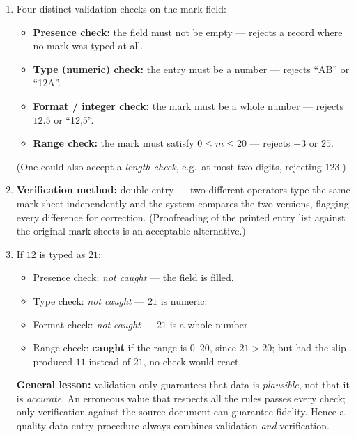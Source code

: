 \documentclass[11pt]{article}
\begin{document}
\begin{corrige}
\begin{enumerate}
\item Four distinct validation checks on the mark field:
\begin{itemize}
\item \textbf{Presence check:} the field must not be empty — rejects a record where no mark was typed at all.
\item \textbf{Type (numeric) check:} the entry must be a number — rejects ``AB'' or ``12A''.
\item \textbf{Format / integer check:} the mark must be a whole number — rejects $12.5$ or ``12,5''.
\item \textbf{Range check:} the mark must satisfy $0 \le m \le 20$ — rejects $-3$ or $25$.
\end{itemize}
(One could also accept a \emph{length check}, e.g.\ at most two digits, rejecting $123$.)
\item \textbf{Verification method:} double entry — two different operators type the same mark sheet independently and the system compares the two versions, flagging every difference for correction. (Proofreading of the printed entry list against the original mark sheets is an acceptable alternative.)
\item If $12$ is typed as $21$:
\begin{itemize}
\item Presence check: \emph{not caught} — the field is filled.
\item Type check: \emph{not caught} — $21$ is numeric.
\item Format check: \emph{not caught} — $21$ is a whole number.
\item Range check: \textbf{caught} if the range is $0$--$20$, since $21 > 20$; but had the slip produced $11$ instead of $21$, no check would react.
\end{itemize}
\textbf{General lesson:} validation only guarantees that data is \emph{plausible}, not that it is \emph{accurate}. An erroneous value that respects all the rules passes every check; only verification against the source document can guarantee fidelity. Hence a quality data-entry procedure always combines validation \emph{and} verification.
\end{enumerate}
\end{corrige}
\end{document}
